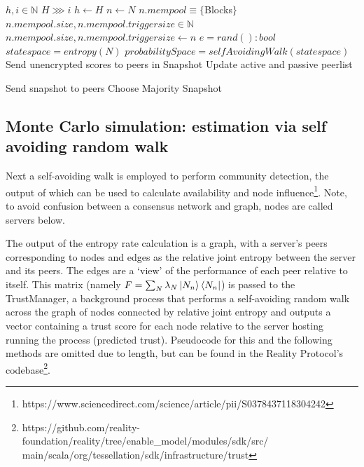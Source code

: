 \documentclass{article}
\theoremstyle{definition}
\theoremstyle{remark}
\theoremstyle{plain}
\begin{document}
\begin{algorithm}
\caption{Online Algorithm (permisioned): Approximate Entropy Rate (current implementation, optimal for minimal resource usage, training model over shorter periods should help output, spamming results/sybil collusion should be detected by model, good test)}\label{alg:cap}
\begin{algorithmic}
\State $h, i \in \mathbb{N}$
\State $H \ggg  i$
\State $h \gets H$
\State $n \gets N$ 
\State $n.mempool \equiv \{ $Blocks$ \}$
\State $n.mempool.size, n.mempool.triggersize \in \mathbb{N}$
\State  $n.mempool.size, n.mempool.triggersize \gets n$ 
\State $e = rand(): bool $ 
		 \State $state space = entropy(N)$ 
   	 	\State $probabilitySpace = selfAvoidingWalk (state space)$  
	 	\State Send unencrypted scores to peers in Snapshot
	 	\State Update active and passive peerlist
		
			\State Send snapshot to peers
			\State Choose Majority Snapshot
	\EndIf
\EndWhile
\end{algorithmic}
\end{algorithm}

\subsection{Monte Carlo simulation: estimation via self avoiding random walk}
Next a self-avoiding walk is employed to perform community detection, the output of which can be used to calculate availability and node influence\footnote{https://www.sciencedirect.com/science/article/pii/S0378437118304242}. Note, to avoid confusion between a consensus network and graph, nodes are called servers below.

The output of the entropy rate calculation is a graph, with a server’s peers corresponding to nodes and edges as the relative joint entropy between the server and its peers. The edges are a ‘view’ of the performance of each peer relative to itself. This matrix (namely $F = \sum_N \lambda_N \ket{N_n} \bra{N_n}$) is passed to the TrustManager, a background process that performs a self-avoiding random walk across the graph of nodes connected by relative joint entropy and outputs a vector containing a trust score for each node relative to the server hosting running the process (predicted trust). Pseudocode for this and the following methods are omitted due to length, but can be found in the Reality Protocol's codebase\footnote{https://github.com/reality-foundation/reality/tree/enable\_model/modules/sdk/src/\\main/scala/org/tessellation/sdk/infrastructure/trust}.
\end{document}
